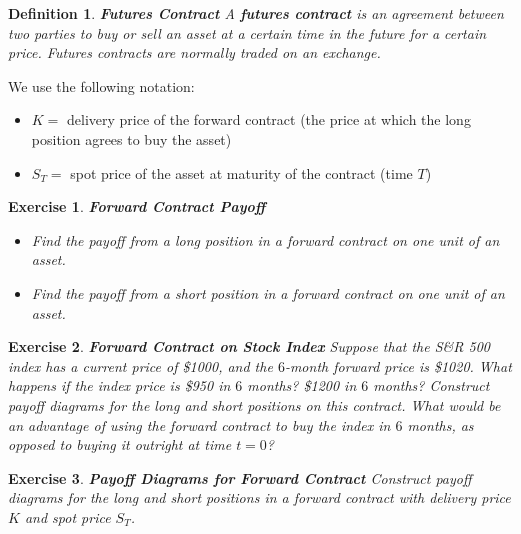 \documentclass[letterpaper,10pt]{article}
\newtheorem{df}{Definition}[section]
\newtheorem{ex}{Exercise}
\begin{document}
\begin{df}{\bf Futures Contract}
A {\bf futures contract} is an agreement between two parties to buy or sell an asset at a certain time in the future for a certain price. Futures contracts are normally traded on an exchange.
\end{df}

\noindent We use the following notation:

\begin{itemize}

\item $K=$ delivery price of the forward contract (the price at which the long position agrees to buy the asset)

\item $S_T=$ spot price of the asset at maturity of the contract (time $T$)

\end{itemize}

\begin{ex}{\bf Forward Contract Payoff}


\begin{itemize}

\item Find the payoff from a long position in a forward contract on one unit of an asset.

\item Find the payoff from a short position in a forward contract on one unit of an asset.

\end{itemize}


\end{ex}


\begin{ex}{\bf Forward Contract on Stock Index}
Suppose that the S\&R 500 index has a current price of \$1000, and the $6$-month forward price is \$1020.  What happens if the index price is \$950 in $6$ months?  \$1200 in $6$ months?  Construct payoff diagrams for the long and short positions on this contract.  What would be an advantage of using the forward contract to buy the index in $6$ months, as opposed to buying it outright at time $t=0$?  
\end{ex}


\begin{ex}{\bf Payoff Diagrams for Forward Contract}
Construct payoff diagrams for the long and short positions in a forward contract with delivery price $K$ and spot price $S_T$.
\end{ex}
\end{document}
